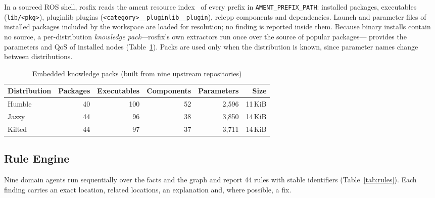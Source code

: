 \documentclass[conference]{IEEEtran}
\newcommand{\code}[1]{\texttt{#1}}
\begin{document}
In a sourced ROS shell, rosfix reads the ament resource index~\cite{ament_index} of every prefix
in \code{AMENT\_PREFIX\_PATH}: installed packages, executables (\code{lib/<pkg>}), pluginlib
plugins (\code{<category>\_\_pluginlib\_\_plugin}), rclcpp components and dependencies. Launch and
parameter files of installed packages included by the workspace are loaded for resolution; no
finding is reported inside them. Because binary installs contain no source, a per-distribution
\emph{knowledge pack}---rosfix's own extractors run once over the source of popular packages---
provides the parameters and QoS of installed nodes (Table~\ref{tab:packs}). Packs are used only
when the distribution is known, since parameter names change between distributions.

\begin{table}[t]
\centering
\caption{Embedded knowledge packs (built from nine upstream repositories)}
\label{tab:packs}
\footnotesize
\begin{tabular}{@{}lrrrrr@{}}
\toprule
Distribution & Packages & Executables & Components & Parameters & Size \\
\midrule
Humble & 40 & 100 & 52 & 2{,}596 & 11\,KiB\\
Jazzy  & 44 &  96 & 38 & 3{,}850 & 14\,KiB\\
Kilted & 44 &  97 & 37 & 3{,}711 & 14\,KiB\\
\bottomrule
\end{tabular}
\end{table}

\subsection{Rule Engine}
\label{sec:rules}

Nine domain agents run sequentially over the facts and the graph and report 44 rules with
stable identifiers (Table~\ref{tab:rules}). Each finding carries an exact location, related
locations, an explanation and, where possible, a fix.
\end{document}
